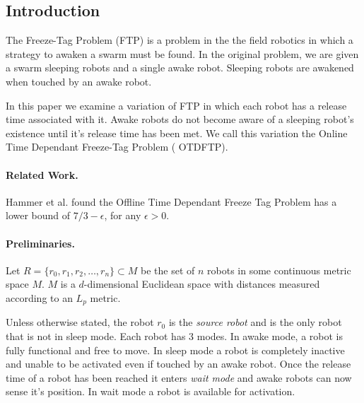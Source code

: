 \documentclass[twoside]{article}
\begin{document}
\maketitle %
\thispagestyle{fancy} %


\begin{multicols}{2} %


\section{Introduction}
The Freeze-Tag Problem (FTP) \cite{FTP.0} is a problem in the the field robotics in which a strategy to awaken a swarm must be found. In the original problem, we are given a swarm sleeping robots and a single awake robot. Sleeping robots are awakened when touched by an awake robot.

In this paper we examine a variation of FTP \cite{FTP.1} in which each robot has a release time associated with it. Awake robots do not become aware of a sleeping robot's existence until it's release time has been met. We call this variation the Online Time Dependant Freeze-Tag Problem ( OTDFTP). 
\paragraph{Related Work.}
Hammer et al. \cite{FTP.1} found the Offline Time Dependant Freeze Tag Problem has a lower bound of $7/3 - \epsilon$, for any $\epsilon > 0$. 
\paragraph{Preliminaries.}
Let $R = \{r_0, r_1, r_2, \dots , r_n \} \subset M$ be the set of $n$ robots in some continuous metric space $M$. $M$ is a $d$-dimensional Euclidean space with distances measured according to an $L_p$ metric.

Unless otherwise stated, the robot $r_0$ is the \textit{source robot} and is the only robot that is not in sleep mode. Each robot has 3 modes. In awake mode, a robot is fully functional and free to move. In sleep mode a robot is completely inactive and unable to be activated even if touched by an awake robot. Once the release time of a robot has been reached it enters \textit{wait mode} and awake robots can now sense it's position. In wait mode a robot is available for activation.


\end{multicols}
\end{document}
